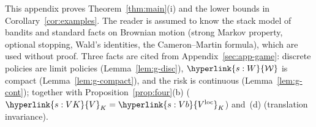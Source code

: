 \documentclass[11pt]{article}
\DeclareRobustCommand{\sy}[2]{{\hyperlink{#1}{#2}}}
\newcommand{\1}{\mathbf{1}}
\newcommand{\Wc}{\sy{s:W}{\mathcal W}}
\newcommand{\VK}{\sy{s:VK}{V}}
\newcommand{\Vloc}{\sy{s:Vb}{V^{\mathrm{loc}}}}
\begin{document}
\newcommand{\lvp}{\sy{l:ef}{\varpi}}
\newcommand{\lTh}{\sy{l:ef}{\Theta}}
\newcommand{\lpsi}{\sy{l:ef}{\psi}}
\newcommand{\lthz}{\sy{l:ef}{\theta_0}}
\newcommand{\lmuz}{\sy{l:ef}{\mu_0}}
\newcommand{\lsd}{\sy{l:ef}{\varsigma}}
\newcommand{\lnuT}{\sy{l:local}{\nu^{(T,h)}}}
\newcommand{\lM}{\sy{l:space}{M}}
\newcommand{\lFo}{\sy{l:space}{\mathfrak F_1}}
\newcommand{\lG}{\sy{l:space}{\mathfrak G}}
\newcommand{\lphi}{\sy{l:space}{\varphi}}
\newcommand{\lJ}{\sy{l:const}{J}}
\newcommand{\lcth}{\sy{l:const}{c_3}}
\newcommand{\lnub}{\sy{l:const}{\bar\nu}}
\newcommand{\lmq}{\sy{l:const}{m_4}}
\newcommand{\lvb}{\sy{l:const}{\bar v}}
\newcommand{\lTone}{\sy{l:const}{T_1}}
\newcommand{\letT}{\sy{l:const}{\eta_T}}
\newcommand{\lepT}{\sy{l:const}{\varepsilon_T}}
\newcommand{\lGam}{\sy{l:stair}{\Gamma}}
\newcommand{\lsimal}{\sy{l:sim}{simulated allocation}}
\newcommand{\lsimpol}{\sy{l:sim}{simulated limit policy}}
\newcommand{\lL}{\sy{l:lr}{L}}
\newcommand{\lDT}{\sy{l:lr}{D_T}}
\newcommand{\lcg}{\sy{l:tilt}{c_g}}
\newcommand{\lnug}{\sy{l:tilt}{\nu^{(T,h)}_g}}
\newcommand{\lepTp}{\sy{l:tilt}{\varepsilon'_T}}
\providecommand{\gOs}{\sy{g:pol}{\Omega^\circ}}
\providecommand{\gPh}{\sy{g:pol}{\mathbb P}}
\providecommand{\gEh}{\sy{g:pol}{\mathbb E}}
\providecommand{\gWi}{\sy{g:pol}{\mathbb W}}
\providecommand{\gDc}{\sy{g:pol}{\mathcal D}}
\providecommand{\gQp}[1]{\sy{g:pol}{Q^{#1}}}
\providecommand{\gSmp}{\sy{g:not}{\Lambda_K}}
\providecommand{\gGp}{\sy{g:not}{\Delta}}


\medskip
\noindent This appendix proves Theorem~\ref{thm:main}(i) and the lower bounds in Corollary~\ref{cor:examples}. The reader is assumed to know the stack model of
bandits and standard facts on Brownian motion (strong Markov property, optional stopping, Wald's identities, the Cameron--Martin formula), which are used without
proof. Three facts are cited from Appendix~\ref{sec:app-game}: discrete policies are limit policies (Lemma~\ref{lem:g-disc}), $\Wc$ is compact
(Lemma~\ref{lem:g-compact}), and the risk is continuous (Lemma~\ref{lem:g-cont}); together with Proposition~\ref{prop:four}(b) ($\VK_K=\Vloc_K$) and~(d)
(translation invariance).
\end{document}
